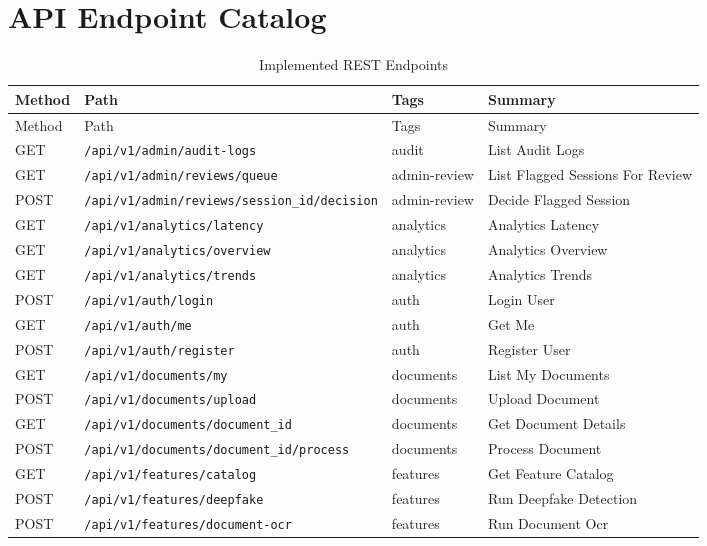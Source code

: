 \section{API Endpoint Catalog}
\label{app:api-catalog}
\small
\setlength{\LTleft}{0pt}
\setlength{\LTright}{0pt}
\begin{longtable}{p{1.2cm}p{6.0cm}p{3.2cm}p{4.0cm}}
\caption{Implemented REST Endpoints}\\
\hline
Method & Path & Tags & Summary \\
\hline
\endfirsthead
\hline
Method & Path & Tags & Summary \\
\hline
\endhead
GET & \texttt{/api/v1/admin/audit-logs} & audit & List Audit Logs \\
\hline
GET & \texttt{/api/v1/admin/reviews/queue} & admin-review & List Flagged Sessions For Review \\
\hline
POST & \texttt{/api/v1/admin/reviews/{session\_id}/decision} & admin-review & Decide Flagged Session \\
\hline
GET & \texttt{/api/v1/analytics/latency} & analytics & Analytics Latency \\
\hline
GET & \texttt{/api/v1/analytics/overview} & analytics & Analytics Overview \\
\hline
GET & \texttt{/api/v1/analytics/trends} & analytics & Analytics Trends \\
\hline
POST & \texttt{/api/v1/auth/login} & auth & Login User \\
\hline
GET & \texttt{/api/v1/auth/me} & auth & Get Me \\
\hline
POST & \texttt{/api/v1/auth/register} & auth & Register User \\
\hline
GET & \texttt{/api/v1/documents/my} & documents & List My Documents \\
\hline
POST & \texttt{/api/v1/documents/upload} & documents & Upload Document \\
\hline
GET & \texttt{/api/v1/documents/{document\_id}} & documents & Get Document Details \\
\hline
POST & \texttt{/api/v1/documents/{document\_id}/process} & documents & Process Document \\
\hline
GET & \texttt{/api/v1/features/catalog} & features & Get Feature Catalog \\
\hline
POST & \texttt{/api/v1/features/deepfake} & features & Run Deepfake Detection \\
\hline
POST & \texttt{/api/v1/features/document-ocr} & features & Run Document Ocr \\

\end{longtable}
